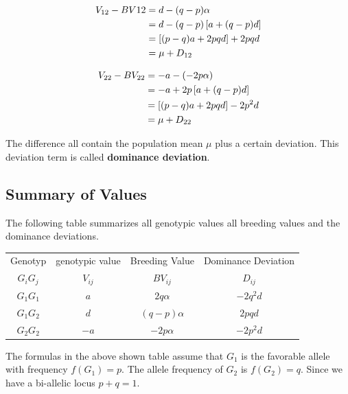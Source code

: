 \documentclass[
]{book}
\theoremstyle{definition}
\theoremstyle{definition}
\theoremstyle{definition}
\theoremstyle{remark}
\begin{document}
\begin{align}
  V_{12} - BV{12} &=   d - (q-p)\alpha \notag \\
                   &=   d - (q-p)\left[ a + (q-p)d \right] \notag \\
                   &=   \left[(p-q)a + 2pqd\right] + 2pqd \notag \\
                   &=   \mu + D_{12}
  \end{align}

\begin{align}
  V_{22} - BV_{22} &=   -a - (-2p\alpha) \notag \\
                   &=   -a + 2p\left[ a + (q-p)d \right] \notag \\
                   &=   \left[(p-q)a + 2pqd\right] - 2p^2d \notag \\
                   &=   \mu + D_{22} \notag
  \end{align}

The difference all contain the population mean \(\mu\) plus a certain deviation. This deviation term is called \textbf{dominance deviation}.

\hypertarget{summary-of-values}{%
\subsection{Summary of Values}\label{summary-of-values}}

The following table summarizes all genotypic values all breeding values and the dominance deviations.

\begin{tabular}{|c|c|c|c|}
   \hline
   Genotyp  &  genotypic value     &  Breeding Value    &  Dominance Deviation \\
   $G_iG_j$ &  $V_{ij}$            &  $BV_{ij}$         &  $D_{ij}$           \\
   \hline
   $G_1G_1$ &  $a$                 &  $2q\alpha$        &  $-2q^2d$          \\
   \hline
   $G_1G_2$ &  $d$                 &  $(q-p)\alpha$     & $2pqd$             \\
   \hline
   $G_2G_2$ &  $-a$                &  $-2p\alpha$       & $-2p^2d$           \\
   \hline
\end{tabular}

The formulas in the above shown table assume that \(G_1\) is the favorable allele with frequency \(f(G_1) = p\). The allele frequency of \(G_2\) is \(f(G_2) = q\). Since we have a bi-allelic locus \(p+q=1\).
\end{document}
